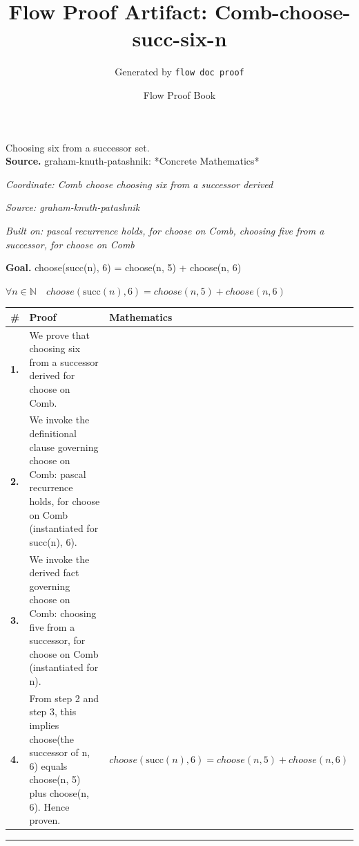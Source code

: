 \documentclass[11pt]{article}
\title{Flow Proof Artifact: Comb-choose-succ-six-n}
\author{Generated by \texttt{flow doc proof}}
\date{Flow Proof Book}
\theoremstyle{definition}
\begin{document}
\maketitle
Choosing six from a successor set.\\[0.5em]
\textbf{Source.} graham-knuth-patashnik: *Concrete Mathematics*\\[0.5em]
\bigskip
{}\par
\smallskip\noindent\textit{Coordinate: Comb \cdot choose \cdot choosing six from a successor derived}\par
\smallskip\noindent\textit{Source: graham-knuth-patashnik}\par
\smallskip\noindent\textit{Built on: pascal recurrence holds, for choose on Comb, choosing five from a successor, for choose on Comb}\par
\medskip
\noindent\textbf{Goal.} choose(succ(n), 6) = choose(n, 5) + choose(n, 6)\par
\noindent$\displaystyle \forall n \in \mathbb{N}\quad choose(\mathrm{succ}(n), 6) = choose(n, 5) + choose(n, 6)$\par
\medskip
\noindent
\begin{tabular}{@{} >{\raggedright\arraybackslash}p{} >{\raggedright\arraybackslash}p{} >{\raggedleft\arraybackslash}p{} @{}}
\textbf{\#} & \textbf{Proof} & \textbf{Mathematics} \\
\midrule
\textbf{1.} & We prove that choosing six from a successor derived for choose on Comb. & \\[0.45em]
\textbf{2.} & We invoke the definitional clause governing choose on Comb: pascal recurrence holds, for choose on Comb (instantiated for succ(n), 6). & \\[0.45em]
\textbf{3.} & We invoke the derived fact governing choose on Comb: choosing five from a successor, for choose on Comb (instantiated for n). & \\[0.45em]
\textbf{4.} & From step 2 and step 3, this implies choose(the successor of n, 6) equals choose(n, 5) plus choose(n, 6). Hence proven. & $\displaystyle choose(\mathrm{succ}(n), 6) = choose(n, 5) + choose(n, 6)$ \\[0.45em]
\bottomrule
\end{tabular}
\label{thm:Comb-choose-choosing_six_from_a_successor_derived}
\par\medskip\hrule
\end{document}
